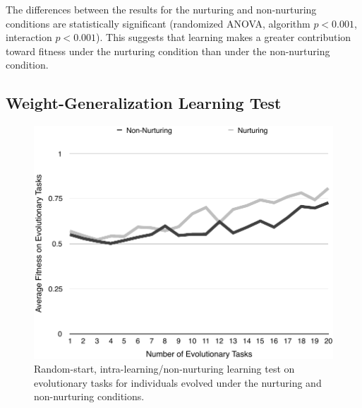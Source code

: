 \documentclass[master]{outhesis}
\begin{document}
The differences between the results for the nurturing and non-nurturing conditions are statistically significant (randomized ANOVA, algorithm $p < 0.001$, interaction $p < 0.001$).
This suggests that learning makes a greater contribution toward fitness under the nurturing condition than under the non-nurturing condition.

\subsection{Weight-Generalization Learning Test}

\begin{figure}[h]
	\centering
	\includegraphics{NonNurturingLearningTestPlot.pdf}
	\caption{Random-start, intra-learning/non-nurturing learning test on evolutionary tasks for individuals evolved under the nurturing and non-nurturing conditions.}
	\label{fig:IntraLearningWeightGeneralizationTest}
\end{figure}
\end{document}

